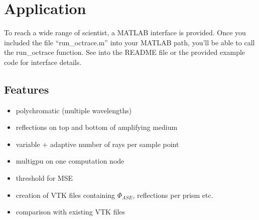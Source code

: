 \section{Application}
To reach a wide range of scientist, a MATLAB interface is provided. Once
you included the file ``run\_octrace.m'' into your MATLAB path, you'll be able
to call the run\_octrace function. See into the README file or the provided
example code for interface details.

\subsection{Features}
\begin{itemize}
  \item polychromatic (multiple wavelengths)
  \item reflections on top and bottom of amplifying medium
  \item variable + adaptive number of rays per sample point
  \item multigpu on one computation node
  \item threshold for MSE
  \item creation of VTK files containing $\Phi_{ASE}$, reflections per prism etc.
  \item comparison with existing VTK files 
\end{itemize}

